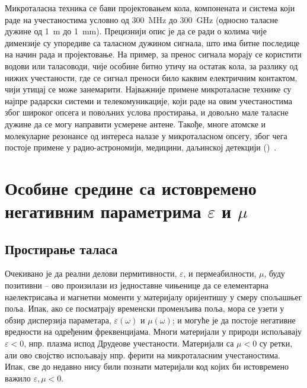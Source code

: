 \documentclass[12pt,oneside]{book}
\begin{document}
Микроталасна техника се бави пројектовањем кола, компонената и система који раде на учестаностима условно од \SI{300}{\mega\hertz} до \SI{300}{\giga\hertz} (односно таласне дужине од \SI{1}{\meter} до \SI{1}{\milli\meter}). Прецизнији опис је да се ради о колима чије димензије су упоредиве са таласном дужином сигнала, што има битне последице на начин рада и пројектовање. На пример, за пренос сигнала морају се користити водови или таласоводи, чије особине битно утичу на остатак кола, за разлику од нижих учестаности, где се сигнал преноси било каквим електричним контактом, чији утицај се може занемарити. Најважније примене микроталасне технике су најпре радарски системи и телекомуникације, који раде на овим учестаностима због широког опсега и повољних услова простирања, и довољно мале таласне дужине да се могу направити усмерене антене. Такође, многе атомске и молекуларне резонансе од интереса налазе у микроталасном опсегу, због чега постоје примене у радио-астрономији, медицини, даљинској детекцији ()~\cite{djordjevic2005mikrotalasna,pozar2009microwave}.  \cite{markes_knjiga}

\section{Особине средине са истовремено негативним параметрима $\varepsilon$ и $\mu$}
\subsection{Простирање таласа}

Очекивано је да реални делови пермитивности, $\varepsilon$, и пермеабилности, $\mu$, буду позитивни – ово произилази из једноставне чињенице да се елементарна наелектрисања и магнетни моменти у материјалу оријентишу у смеру спољашњег поља. Ипак, ако се посматрају временски променљива поља, мора се узети у обзир дисперзија параметара, $\varepsilon(\omega)$ и $\mu(\omega)$; и могуће је да постоје негативне вредности на одређеним фреквенцијама. Многи материјали у природи испољавају $\varepsilon < 0$, нпр. плазма испод Друдеове учестаности. Материјали са $\mu<0$ су ретки, али ово својство испољавају нпр. ферити на микроталасним учестаностима. Ипак, све до недавно нису били познати материјали код којих би истовремено важило $\varepsilon,\mu < 0$.
\end{document}
